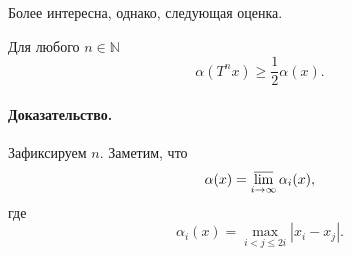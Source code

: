 Более интересна, однако, следующая оценка.
\begin{theorem}
	Для любого $n\in\mathbb{N}$
	\begin{equation}
		\alpha(T^n x) \geq \frac{1}{2} \alpha(x)
		.
	\end{equation}
\end{theorem}

\paragraph{Доказательство.}
Зафиксируем $n$.
Заметим, что
\begin{equation}
	\alpha(x) = \varlimsup_{i\to\infty} \alpha_i(x),
\end{equation}
где
\begin{equation}
	\alpha_i(x) = \max_{i < j \leqslant 2i} |x_i - x_j|.
\end{equation}

